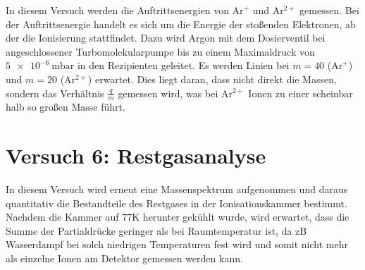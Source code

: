 In diesem Versuch werden die Auftrittsenergien von Ar$^{+}$ und Ar$^{2+}$ gemessen. Bei der Auftrittsenergie handelt es sich um die Energie der stoßenden Elektronen, ab der die Ionisierung stattfindet.
Dazu wird Argon mit dem Dosierventil bei angeschlossener Turbomolekularpumpe bis zu einem Maximaldruck von $\SI{5e-6}{\milli\bar}$ in den Rezipienten geleitet. Es werden Linien bei $m=40$ (Ar$^{+}$) und $m=20$ (Ar$^{2+}$) erwartet. Dies liegt daran, dass nicht direkt die Massen, sondern das Verhältnis $\frac{q}{m}$ gemessen wird, was bei Ar$^{2+}$ Ionen zu einer scheinbar halb so großen Masse führt.

\section{Versuch 6: Restgasanalyse}

In diesem Versuch wird erneut eine Massenspektrum aufgenommen und daraus quantitativ die Bestandteile des Restgases in der Ionisationskammer bestimmt.
Nachdem die Kammer auf 77\;K herunter gekühlt wurde, wird erwartet, dass die Summe der Partialdrücke geringer als bei Raumtemperatur ist, da zB Wasserdampf bei solch niedrigen Temperaturen fest wird und somit nicht mehr als einzelne Ionen am Detektor gemessen werden kann.

